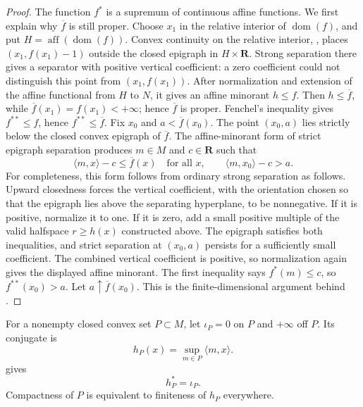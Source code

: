 \begin{proof}
The function \(f^*\) is a supremum of continuous affine functions.
We first explain why \(\overline f\) is still proper.  Choose
\(x_1\) in the relative interior of \(\operatorname{dom}(f)\), and put
\(H=\operatorname{aff}(\operatorname{dom}(f))\).  Convex continuity on
the relative interior, \cite[Theorem~10.1]{Roc70}, places
\((x_1,f(x_1)-1)\) outside the closed epigraph in \(H\times\mathbf R\).
Strong separation there gives a separator with positive vertical
coefficient: a zero coefficient could not distinguish this point from
\((x_1,f(x_1))\).  After normalization and extension of the affine
functional from \(H\) to \(N\), it gives an affine minorant \(h\leq f\).
Then \(h\leq\overline f\), while
\(\overline f(x_1)=f(x_1)<+\infty\); hence \(\overline f\) is proper.
Fenchel's inequality gives \(f^{**}\leq f\), hence
\(f^{**}\leq\overline f\).
Fix \(x_0\) and \(a<\overline f(x_0)\).
The point \((x_0,a)\) lies strictly below the closed convex epigraph of
\(\overline f\).
The affine-minorant form of strict epigraph separation produces
\(m\in M\) and \(c\in\mathbf R\) such that
\[
 \langle m,x\rangle-c\leq\overline f(x)
 \quad\text{for all }x,\qquad
 \langle m,x_0\rangle-c>a.
\]
For completeness, this form follows from ordinary strong separation as
follows.  Upward closedness forces the vertical coefficient, with the
orientation chosen so that the epigraph lies above the separating
hyperplane, to be nonnegative.  If it is positive, normalize it to one.  If
it is zero, add a small positive multiple of the valid halfspace
\(r\geq h(x)\) constructed above.  The epigraph satisfies both
inequalities, and strict separation at \((x_0,a)\) persists for a
sufficiently small coefficient.  The combined vertical coefficient is
positive, so normalization again gives the displayed affine minorant.
The first inequality says \(f^*(m)\leq c\), so \(f^{**}(x_0)>a\).
Let \(a\uparrow\overline f(x_0)\).
This is the finite-dimensional argument behind
\cite[Theorem~12.2]{Roc70}.
\end{proof}

\begin{example}
\label{ex:appD-indicator-support}
For a nonempty closed convex set \(P\subset M\), let
\(\iota_P=0\) on \(P\) and \(+\infty\) off \(P\).
Its conjugate is
\[
 h_P(x)=\sup_{m\in P}\langle m,x\rangle.
\tag{D.6}\label{eq:appD-support}
\]
 gives
\[
                         h_P^*=\iota_P.
\tag{D.7}\label{eq:appD-support-dual}
\]
Compactness of \(P\) is equivalent to finiteness of \(h_P\) everywhere.
\end{example}

